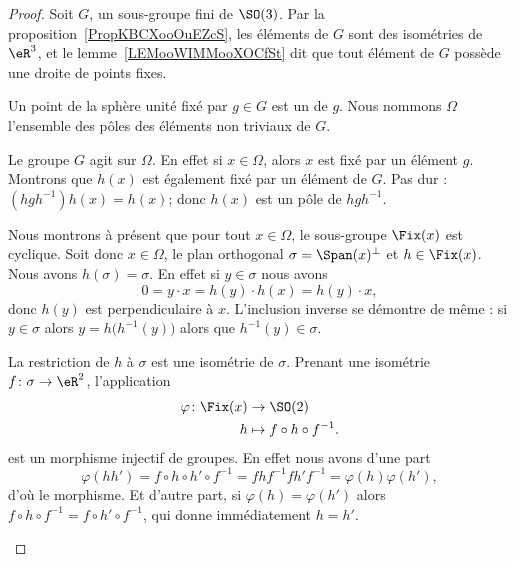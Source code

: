 \begin{proof}
	Soit \( G\), un sous-groupe fini de \( \SO(3)\). Par la proposition~\ref{PropKBCXooOuEZcS}, les éléments de \( G\) sont des isométries de \( \eR^3\), et le lemme~\ref{LEMooWIMMooXOCfSt} dit que tout élément de \( G\) possède une droite de points fixes.

	Un point de la sphère unité fixé par \( g\in G\) est un  de \( g\). Nous nommons \( \Omega\) l'ensemble des pôles des éléments non triviaux de \( G\).
	\begin{subproof}
		Le groupe \( G\) agit sur \( \Omega\). En effet si \( x\in \Omega\), alors \( x\) est fixé par un élément \( g\). Montrons que \( h(x)\) est également fixé par un élément de \( G\). Pas dur : \( (hgh^{-1})h(x)=h(x)\); donc \( h(x)\) est un pôle de \( h gh^{-1}\).

		Nous montrons à présent que pour tout \( x\in\Omega\), le sous-groupe \( \Fix(x)\) est cyclique. Soit donc \( x\in\Omega\), le plan orthogonal \( \sigma=\Span(x)^{\perp}\) et \( h\in \Fix(x)\). Nous avons \( h(\sigma)=\sigma\). En effet si \( y\in \sigma\) nous avons
		\begin{equation}
			0=y\cdot x=h(y)\cdot h(x)=h(y)\cdot x,
		\end{equation}
		donc \( h(y)\) est perpendiculaire à \( x\). L'inclusion inverse se démontre de même : si \( y\in \sigma\) alors \( y=h\big( h^{-1}(y) \big)\) alors que \( h^{-1}(y)\in \sigma\).

		La restriction de \( h\) à \( \sigma\) est une isométrie de \( \sigma\). Prenant une isométrie \( f\colon \sigma\to \eR^2\), l'application
		\begin{equation}
			\begin{aligned}
				\varphi\colon \Fix(x) & \to \SO(2)                    \\
				h                     & \mapsto f\circ h\circ f^{-1}.
			\end{aligned}
		\end{equation}
		est un morphisme injectif de groupes. En effet nous avons d'une part
		\begin{equation}
			\varphi(hh')=f\circ h\circ h'\circ f^{-1}=fhf^{-1}fh'f^{-1}=\varphi(h)\varphi(h'),
		\end{equation}
		d'où le morphisme. Et d'autre part, si \( \varphi(h)=\varphi(h')\) alors \( f\circ h\circ f^{-1}=f\circ h'\circ f^{-1}\), qui donne immédiatement \( h=h'\).


\end{subproof}
\end{proof}
